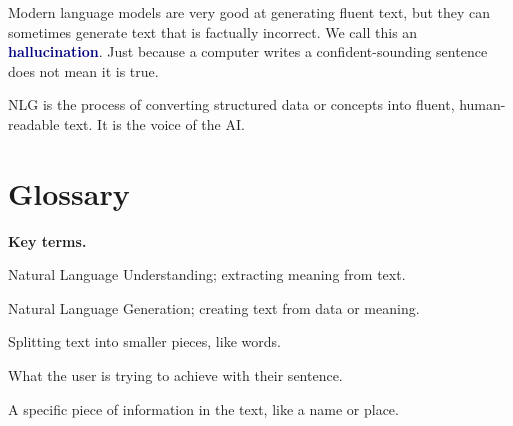 \documentclass[12pt,a4paper]{article}
\newcommand{\vocab}[1]{\textbf{\textcolor{navy}{#1}}}
\begin{document}
\begin{watchout}
Modern language models are very good at generating fluent text, but they can sometimes generate text that is factually incorrect. We call this an \vocab{hallucination}. Just because a computer writes a confident-sounding sentence does not mean it is true.
\end{watchout}

\begin{keytake}
NLG is the process of converting structured data or concepts into fluent, human-readable text. It is the voice of the AI.
\end{keytake}

\section*{Glossary}
\noindent\textbf{Key terms.}
\begin{description}[leftmargin=8.5em,style=nextline,font=\normalfont\bfseries\color{navy}]
  \item[NLU] Natural Language Understanding; extracting meaning from text.
  \item[NLG] Natural Language Generation; creating text from data or meaning.
  \item[Tokenization] Splitting text into smaller pieces, like words.
  \item[Intent] What the user is trying to achieve with their sentence.
  \item[Entity] A specific piece of information in the text, like a name or place.
\end{description}
\end{document}
